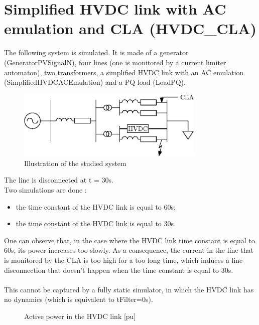 \documentclass[a4paper, 12pt]{report}
\begin{document}
\section{Simplified HVDC link with AC emulation and CLA (HVDC\_CLA)}

The following system is simulated. It is made of a generator (GeneratorPVSignalN), four lines (one is monitored by a current limiter automaton), two transformers, a simplified HVDC link with an AC emulation (SimplifiedHVDCACEmulation) and a PQ load (LoadPQ).\\

\begin{figure}[H]
  \begin{center}
  \includegraphics[width=0.8\textwidth]{HVDC_CLA/HVDC_CLA}
  \end{center}
  \caption{Illustration of the studied system}
\end{figure}

The line is disconnected at t = 30s.\\
Two simulations are done :
\begin{itemize}
\item the time constant of the HVDC link is equal to 60s;
\item the time constant of the HVDC link is equal to 30s.
\end{itemize}

One can observe that, in the case where the HVDC link time constant is equal to 60s, its power increases too slowly. As a consequence, the current in the line that is monitored by the CLA is too high for a too long time, which induces a line disconnection that doesn't happen when the time constant is equal to 30s.\\
\\
This cannot be captured by a fully static simulator, in which the HVDC link has no dynamics (which is equivalent to tFilter=0s).

\begin{figure}[H]
  \caption{Active power in the HVDC link [pu]}
\end{figure}
\end{document}
